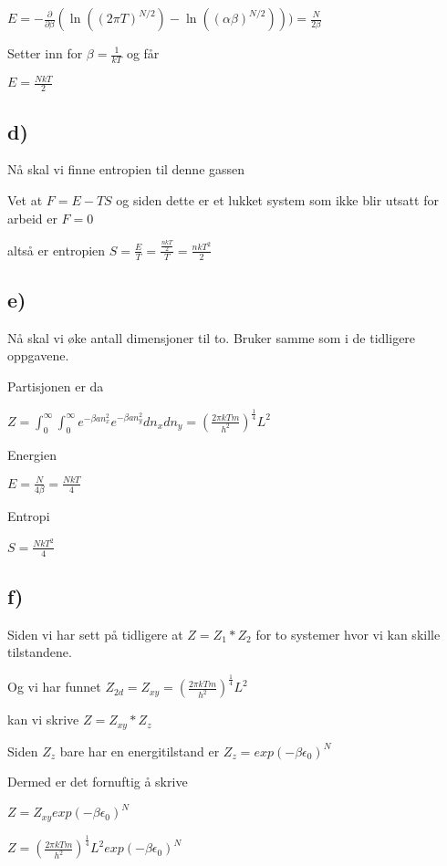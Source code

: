 \documentclass[12pt]{article}
\begin{document}
 $E = -\frac{\partial}{\partial \beta} (\ln((2\pi T)^{N/2}) - \ln((\alpha \beta)^{N/2}))) = \frac{N}{2\beta}$
 
 Setter inn for $\beta = \frac{1}{kT}$ og får 
 
 $E = \frac{NkT}{2}$
 
 \subsection*{d)}
 
 Nå skal vi finne entropien til denne gassen 
 
 Vet at $ F = E-TS$ og siden dette er et lukket system som ikke blir utsatt for arbeid er $F = 0$
 
 altså er entropien $S = \frac{E}{T} = \frac{\frac{nkT}{2}}{T} = \frac{nkT^2}{2}$
 
 
\subsection*{e)}
 
Nå skal vi øke antall dimensjoner til to. Bruker samme som i de tidligere oppgavene.
 
Partisjonen er da 
 
$ Z = \int_0^\infty \int_0^\infty e^{-\beta a n_x^2} e^{-\beta a n_y^2}dn_x dn_y  = (\frac{2\pi kTm}{h^2})^{\frac{1}{4}}L^2$

Energien 

$ E = \frac{N}{4\beta} = \frac{NkT}{4}$ 

Entropi

$S = \frac{NkT^2}{4}$

\subsection*{f) }

Siden vi har sett på tidligere at $Z = Z_1*Z_2$ for to systemer hvor vi kan skille tilstandene. 

Og vi har funnet $Z_{2d} = Z_{xy} = (\frac{2\pi kTm}{h^2})^{\frac{1}{4}}L^2$ 

kan vi skrive $Z = Z_{xy}*Z_z $

Siden $Z_z$ bare har en energitilstand er $Z_z = exp(-\beta \epsilon_0 )^N$

Dermed er det fornuftig å skrive 

$Z = Z_{xy} exp(-\beta \epsilon_0 )^N$

$Z = (\frac{2\pi kTm}{h^2})^{\frac{1}{4}}L^2 exp(-\beta \epsilon_0 )^N$
\end{document}
